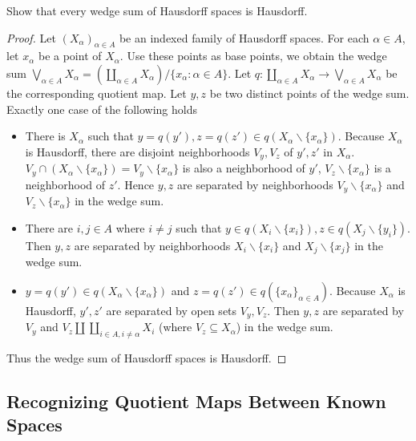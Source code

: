 \begin{exercise}{3.55}
	Show that every wedge sum of Hausdorff spaces is Hausdorff.
\end{exercise}

\begin{proof}
	Let ${(X_{\alpha})}_{\alpha\in A}$ be an indexed family of Hausdorff spaces. For each $\alpha\in A$, let $x_{\alpha}$ be a point of $X_{\alpha}$. Use these points as base points, we obtain the wedge sum $\bigvee_{\alpha\in A}X_{\alpha} = \left(\coprod_{\alpha\in A}X_{\alpha}\right)/\{ x_{\alpha} : \alpha\in A \}$. Let $q: \coprod_{\alpha\in A}X_{\alpha}\to \bigvee_{\alpha\in A}X_{\alpha}$ be the corresponding quotient map. Let $y, z$ be two distinct points of the wedge sum. Exactly one case of the following holds
	\begin{itemize}
		\item There is $X_{\alpha}$ such that $y = q(y'), z = q(z')\in q(X_{\alpha}\smallsetminus\{ x_{\alpha} \})$. Because $X_{\alpha}$ is Hausdorff, there are disjoint neighborhoods $V_{y}, V_{z}$ of $y', z'$ in $X_{\alpha}$. $V_{y}\cap (X_{\alpha}\smallsetminus\{ x_{\alpha} \}) = V_{y}\smallsetminus\{ x_{\alpha} \}$ is also a neighborhood of $y'$, $V_{z}\smallsetminus\{ x_{\alpha} \}$ is a neighborhood of $z'$. Hence $y, z$ are separated by neighborhoods $V_{y}\smallsetminus\{ x_{\alpha} \}$ and $V_{z}\smallsetminus\{ x_{\alpha} \}$ in the wedge sum.
		\item There are $i, j\in A$ where $i\ne j$ such that $y\in q(X_{i}\smallsetminus\{ x_{i} \}), z\in q(X_{j}\smallsetminus\{ y_{i} \})$. Then $y, z$ are separated by neighborhoods $X_{i}\smallsetminus\{ x_{i} \}$ and $X_{j}\smallsetminus\{ x_{j} \}$ in the wedge sum.
		\item $y = q(y')\in q(X_{\alpha}\smallsetminus\{x_{\alpha}\})$ and $z = q(z')\in q({\{ x_{\alpha} \}}_{\alpha\in A})$. Because $X_{\alpha}$ is Hausdorff, $y', z'$ are separated by open sets $V_{y}, V_{z}$. Then $y, z$ are separated by $V_{y}$ and $V_{z}\amalg \coprod_{i\in A, i\ne\alpha}X_{i}$ (where $V_{z}\subseteq X_{\alpha}$) in the wedge sum.
	\end{itemize}

	Thus the wedge sum of Hausdorff spaces is Hausdorff.
\end{proof}

\subsection*{Recognizing Quotient Maps Between Known Spaces}

